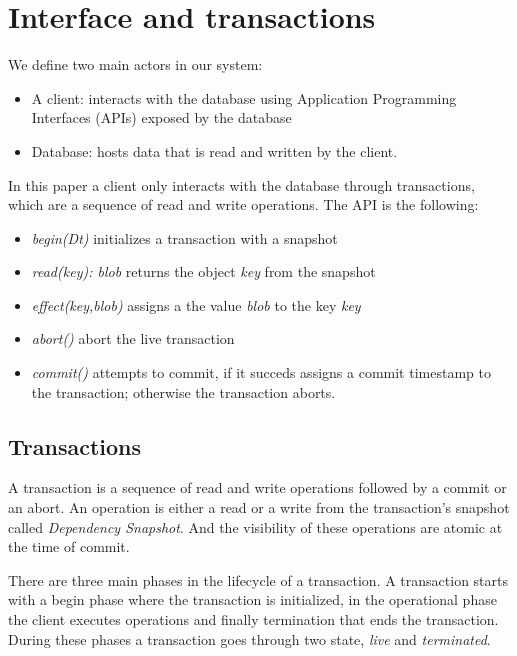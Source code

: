 \documentclass[systeme]{compas2022}
\begin{document}
\section{Interface and transactions}

We define two main actors in our system:
\begin{itemize}
  \item A client: interacts with the database using Application Programming Interfaces (APIs) exposed by the database
  \item Database: hosts data that is read and written by the client.\\
\end{itemize}

In this paper a client only interacts with the database through transactions, which are a sequence of read and write operations.
The API is the following:
\begin{itemize}
  \item \emph{begin(Dt)} initializes a transaction with a snapshot
  \item \emph{read(key): blob} returns the object \emph{key} from the snapshot
  \item \emph{effect(key,blob)} assigns a the value \emph{blob} to the key \emph{key}
  \item \emph{abort()} abort the live transaction
  \item \emph{commit()} attempts to commit, if it succeds assigns a commit timestamp to the transaction; otherwise the transaction aborts.
\end{itemize}


\subsection{Transactions}

A transaction is a sequence of read and write operations followed by a commit or an abort.
An operation is either a read or a write from the transaction's snapshot called \emph{Dependency Snapshot}.
And the visibility of these operations are atomic at the time of commit.

There are three main phases in the lifecycle of a transaction.
A transaction starts with a begin phase where the transaction is initialized, in the operational phase the client executes operations and finally termination that ends the transaction.
During these phases a transaction goes through two state, \emph{live} and \emph{terminated}.
\end{document}

